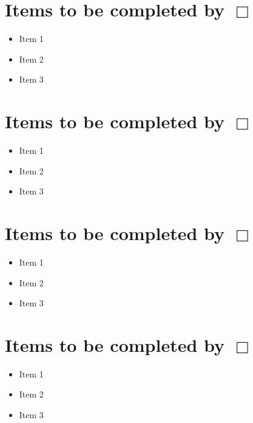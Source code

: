 \documentclass[12pt,letterpaper,draft,titlepage]{article}
\begin{document}
\section{Items to be completed by \DayAfter[-14] $\Box$}
\begin{itemize}
\item Item 1
\item Item 2
\item Item 3
\end{itemize}

\section{Items to be completed by \DayAfter[-7] $\Box$}
\begin{itemize}
\item Item 1
\item Item 2
\item Item 3
\end{itemize}

\section{Items to be completed by \DayAfter[-1] $\Box$}
\begin{itemize}
\item Item 1
\item Item 2
\item Item 3
\end{itemize}

\section{Items to be completed by \DayAfter[0] $\Box$}
\begin{itemize}
\item Item 1
\item Item 2
\item Item 3
\end{itemize}
\end{document}
